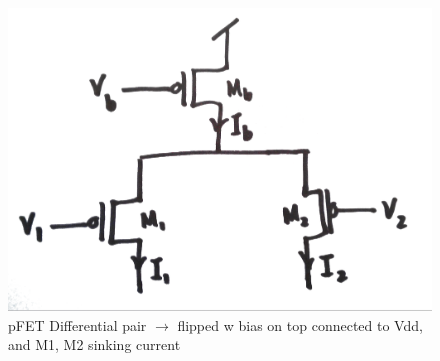 \documentclass[main]{subfiles}
\begin{document}
\begin{figure}[htbp]
  \centering
  \includegraphics[scale=0.2]{figs/pFET_Differential_pair_circuit.png}
  \caption{pFET Differential pair $\rightarrow$ flipped w bias on top connected to Vdd, and M1, M2 sinking current}
  \label{fig:pFET_Differential_pair_circuit}
\end{figure}
\end{document}
